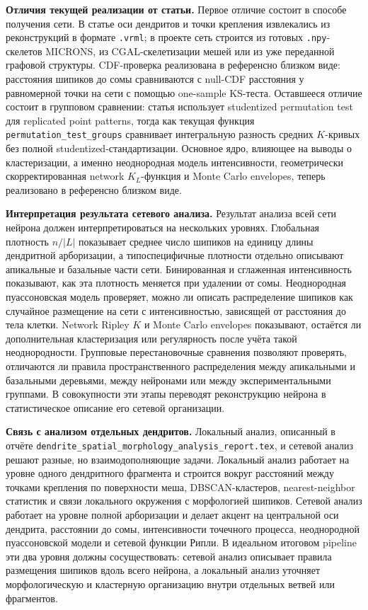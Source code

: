 \documentclass[12pt,a4paper]{article}
\begin{document}
\noindent\textbf{Отличия текущей реализации от статьи.}
Первое отличие состоит в способе получения сети. В статье оси дендритов и точки крепления извлекались из реконструкций в формате \texttt{.vrml}; в проекте сеть строится из готовых \texttt{.npy}-скелетов MICRONS, из CGAL-скелетизации мешей или из уже переданной графовой структуры. CDF-проверка реализована в референсно близком виде: расстояния шипиков до сомы сравниваются с null-CDF расстояния у равномерной точки на сети с помощью one-sample KS-теста. Оставшееся отличие состоит в групповом сравнении: статья использует studentized permutation test для replicated point patterns, тогда как текущая функция \texttt{permutation\_test\_groups} сравнивает интегральную разность средних \(K\)-кривых без полной studentized-стандартизации. Основное ядро, влияющее на выводы о кластеризации, а именно неоднородная модель интенсивности, геометрически скорректированная network \(K_L\)-функция и Monte Carlo envelopes, теперь реализовано в референсно близком виде.

\noindent\textbf{Интерпретация результата сетевого анализа.}
Результат анализа всей сети нейрона должен интерпретироваться на нескольких уровнях. Глобальная плотность \(n/|L|\) показывает среднее число шипиков на единицу длины дендритной арборизации, а типоспецифичные плотности отдельно описывают апикальные и базальные части сети. Бинированная и сглаженная интенсивность показывают, как эта плотность меняется при удалении от сомы. Неоднородная пуассоновская модель проверяет, можно ли описать распределение шипиков как случайное размещение на сети с интенсивностью, зависящей от расстояния до тела клетки. Network Ripley \(K\) и Monte Carlo envelopes показывают, остаётся ли дополнительная кластеризация или регулярность после учёта такой неоднородности. Групповые перестановочные сравнения позволяют проверять, отличаются ли правила пространственного распределения между апикальными и базальными деревьями, между нейронами или между экспериментальными группами. В совокупности эти этапы переводят реконструкцию нейрона в статистическое описание его сетевой организации.

\noindent\textbf{Связь с анализом отдельных дендритов.}
Локальный анализ, описанный в отчёте \texttt{dendrite\_spatial\_morphology\_analysis\_report.tex}, и сетевой анализ решают разные, но взаимодополняющие задачи. Локальный анализ работает на уровне одного дендритного фрагмента и строится вокруг расстояний между точками крепления по поверхности меша, DBSCAN-кластеров, nearest-neighbor статистик и связи локального окружения с морфологией шипиков. Сетевой анализ работает на уровне полной арборизации и делает акцент на центральной оси дендрита, расстоянии до сомы, интенсивности точечного процесса, неоднородной пуассоновской модели и сетевой функции Рипли. В идеальном итоговом pipeline эти два уровня должны сосуществовать: сетевой анализ описывает правила размещения шипиков вдоль всего нейрона, а локальный анализ уточняет морфологическую и кластерную организацию внутри отдельных ветвей или фрагментов.
\end{document}
